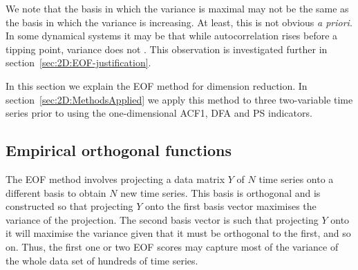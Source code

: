 We note that the basis in which the variance is maximal may not be the same as the basis in which the variance is increasing. At least, this is not obvious {\it a priori}. In some dynamical systems it may be that while autocorrelation rises before a tipping point, variance does not \citep{livina2012, gsell2016}. This observation is investigated further in section~\ref{sec:2D:EOF-justification}.

In this section we explain the EOF method for dimension reduction. In section~\ref{sec:2D:MethodsApplied} we apply this method to three two-variable time series prior to using the one-dimensional ACF1, DFA and PS indicators. 

\subsection{Empirical orthogonal functions}
\label{subsec:2D:EOF:description}

The EOF method involves projecting a data matrix $Y$ of $N$ time series onto a different basis to obtain $N$ new time series. This basis is orthogonal and is constructed so that projecting $Y$ onto the first basis vector maximises the variance of the projection. The second basis vector is such that projecting $Y$ onto it will maximise the variance given that it must be orthogonal to the first, and so on. Thus, the first one or two EOF scores may capture most of the variance of the whole data set of hundreds of time series. 


